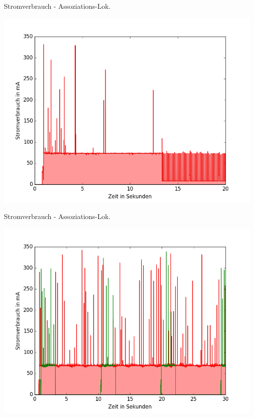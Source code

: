 \documentclass[18pt]{beamer}
\begin{document}
\begin{frame}{Stromverbrauch - Assoziations-Lok.}
	\begin{minipage}[c][\textheight][t]{\textwidth}
		\centering
		\includegraphics[height=0.85\textheight]{plots/tcphold.png}
	\end{minipage}
\end{frame}

\begin{frame}{Stromverbrauch - Assoziations-Lok.}
	\begin{minipage}[c][\textheight][t]{\textwidth}
		\centering
		\includegraphics[height=0.85\textheight]{plots/noap.png}
	\end{minipage}
\end{frame}
\end{document}
